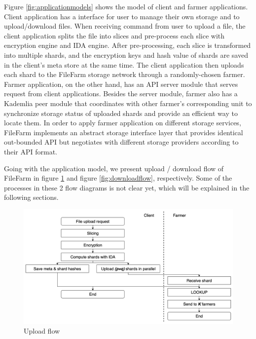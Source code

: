 Figure \ref{fig:applicationmodels} shows the model of client and farmer applications. Client application has a interface for user to manage their own storage and to upload/download files. When receiving command from user to upload a file, the client application splits the file into slices and pre-process each slice with encryption engine and IDA engine. After pre-processing, each slice is transformed into multiple shards, and the encryption keys and hash value of shards are saved in the client's meta store at the same time. The client application then uploads each shard to the FileFarm storage network through a randomly-chosen farmer. Farmer application, on the other hand, has an API server module that serves request from client applications. Besides the server module, farmer also has a Kademlia peer module that coordinates with other farmer's corresponding unit to synchronize storage status of uploaded shards and provide an efficient way to locate them. In order to apply farmer application on different storage services, FileFarm implements an abstract storage interface layer that provides identical out-bounded API but negotiates with different storage providers according to their API format.

Going with the application model, we present upload / download flow of FileFarm in figure \ref{fig:uploadflow} and figure \ref{fig:downloadflow}, respectively. Some of the processes in these 2 flow diagrams is not clear yet, which will be explained in the following sections.

\begin{figure}[hbt]
\centering
  \includegraphics[width=14cm]{figures/upload_flow.png}
  \caption{Upload flow}
  \label{fig:uploadflow}
\end{figure}

